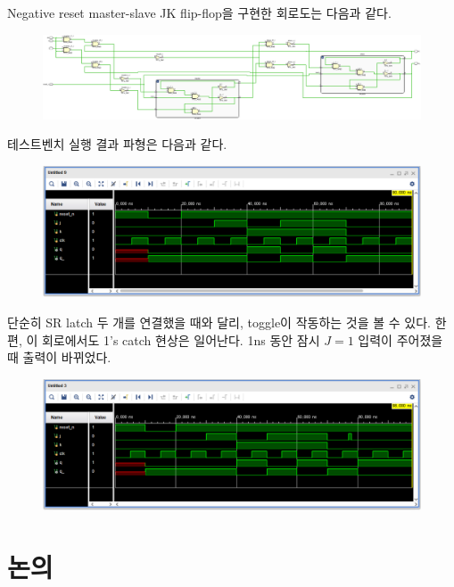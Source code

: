 \documentclass{scrartcl}
\begin{document}
Negative reset master-slave JK flip-flop을 구현한 회로도는 다음과 같다.
\begin{figure}[H]
  \centering
  \includegraphics[width=0.9\linewidth]{lab5_2_schematic-crop.pdf}
\end{figure}
테스트벤치 실행 결과 파형은 다음과 같다.
\begin{figure}[H]
  \centering
  \includegraphics[width=0.9\linewidth]{lab5_2_fixed_waveform.png}
\end{figure}
단순히 SR latch 두 개를 연결했을 때와 달리, toggle이 작동하는 것을 볼 수 있다.
한편, 이 회로에서도 1's catch 현상은 일어난다. 1ns 동안 잠시 \(J = 1\) 입력이 주어졌을 때 출력이 바뀌었다.
\begin{figure}[H]
  \centering
  \includegraphics[width=0.9\linewidth]{lab5_2_fixed_1catch_waveform.png}
\end{figure}

\section{논의}
\end{document}
